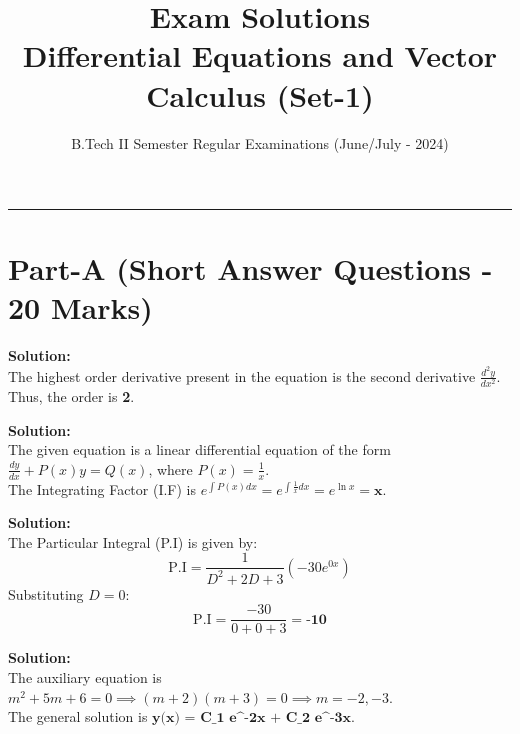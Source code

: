\documentclass[11pt,a4paper]{article}
\title{\vspace{-2cm}\textbf{\huge Exam Solutions} \\ \Large Differential Equations and Vector Calculus (Set-1)}
\author{B.Tech II Semester Regular Examinations (June/July - 2024)}
\date{}
\begin{document}
\maketitle
\hrule
\vspace{0.5cm}

\section*{Part-A (Short Answer Questions - 20 Marks)}

\begin{tcolorbox}[colback=blue!5!white,colframe=blue!75!black,title=\textbf{1(a) Find the order of the D.E} $\frac{d^{2}y}{dx^{2}}+2\left(\frac{dy}{dx}\right)^{2}=5y$]
\textbf{Solution:} \\
The highest order derivative present in the equation is the second derivative $\frac{d^2y}{dx^2}$. Thus, the order is \textbf{2}.
\end{tcolorbox}

\begin{tcolorbox}[colback=blue!5!white,colframe=blue!75!black,title=\textbf{1(b) Find the I.F of} $\frac{dy}{dx}+\frac{y}{x}=x$]
\textbf{Solution:} \\
The given equation is a linear differential equation of the form $\frac{dy}{dx} + P(x)y = Q(x)$, where $P(x) = \frac{1}{x}$. \\
The Integrating Factor (I.F) is $e^{\int P(x) dx} = e^{\int \frac{1}{x} dx} = e^{\ln x} = \textbf{x}$.
\end{tcolorbox}

\begin{tcolorbox}[colback=blue!5!white,colframe=blue!75!black,title=\textbf{1(c) Find the P.I of} $(D^{2}+2D+3)y=-30$]
\textbf{Solution:} \\
The Particular Integral (P.I) is given by:
$$\text{P.I} = \frac{1}{D^2+2D+3} (-30 e^{0x})$$
Substituting $D = 0$:
$$\text{P.I} = \frac{-30}{0+0+3} = \textbf{-10}$$
\end{tcolorbox}

\begin{tcolorbox}[colback=blue!5!white,colframe=blue!75!black,title=\textbf{1(d) Solve the differential equation} $(D^{2}+5D+6)y=0$]
\textbf{Solution:} \\
The auxiliary equation is $m^2+5m+6=0 \implies (m+2)(m+3)=0 \implies m = -2, -3$. \\
The general solution is $\textbf{y(x) = C_1 e^{-2x} + C_2 e^{-3x}}$.
\end{tcolorbox}
\end{document}
